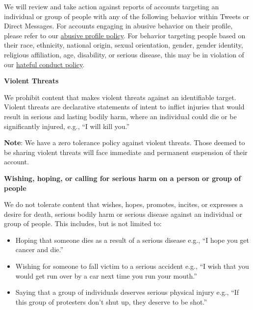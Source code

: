 We will review and take action against reports of accounts targeting an
individual or group of people with any of the following behavior within Tweets
or Direct Messages. For accounts engaging in abusive behavior on their profile,
please refer to our
\href{https://web.archive.org/web/20220905021323/https://help.twitter.com/en/rules-and-policies/abusive-profile.html}{abusive
profile policy}. For behavior targeting people based on their race, ethnicity,
national origin, sexual orientation, gender, gender identity, religious
affiliation, age, disability, or serious disease, this may be in violation of
our
\href{https://web.archive.org/web/20220905021323/https://help.twitter.com/en/rules-and-policies/hateful-conduct-policy.html}{hateful
conduct policy}.


\vspace{.5em}\noindent\textbf{Violent Threats}

\noindent We prohibit content that makes violent threats against an identifiable
target. Violent threats are declarative statements of intent to inflict injuries
that would result in serious and lasting bodily harm, where an individual could
die or be significantly injured, e.g., ``I will kill you.''

\textbf{Note}: We have a zero tolerance policy against violent threats. Those
deemed to be sharing violent threats will face immediate and permanent
suspension of their account.


\vspace{.5em}\noindent\textbf{Wishing, hoping, or calling for serious harm on a
    person or group of people}

\noindent We do not tolerate content that wishes, hopes, promotes, incites, or
expresses a desire for death, serious bodily harm or serious disease against an
individual or group of people. This includes, but is not limited to:

\begin{itemize}
\item Hoping that someone dies as a result of a serious disease e.g., ``I
    hope you get cancer and die.''
\item Wishing for someone to fall victim to a serious accident e.g., ``I
    wish that you would get run over by a car next time you run your
    mouth.''
\item Saying that a group of individuals deserves serious physical injury
    e.g., ``If this group of protesters don't shut up, they deserve to be
    shot.''
\end{itemize}


